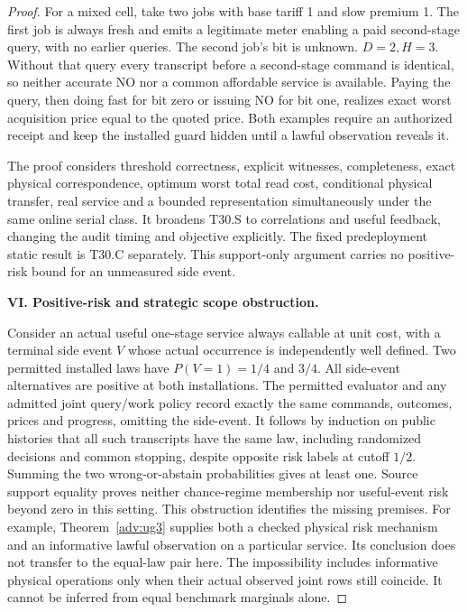 \begin{proof}
For a mixed cell, take two jobs with base tariff 1 and slow premium 1. The first job is always fresh and emits a legitimate meter enabling a paid second-stage query, with no earlier queries. The second job's bit is unknown. \(D=2,H=3\). Without that query every transcript before a second-stage command is identical, so neither accurate NO nor a common affordable service is available. Paying the query, then doing fast for bit zero or issuing NO for bit one, realizes exact worst acquisition price equal to the quoted price. Both examples require an authorized receipt and keep the installed guard hidden until a lawful observation reveals it.

The proof considers threshold correctness, explicit witnesses, completeness, exact physical correspondence, optimum worst total read cost, conditional physical transfer, real service and a bounded representation simultaneously under the same online serial class. It broadens T30.S to correlations and useful feedback, changing the audit timing and objective explicitly. The fixed predeployment static result is T30.C separately. This support-only argument carries no positive-risk bound for an unmeasured side event.

\textbf{VI. Positive-risk and strategic scope obstruction.}

Consider an actual useful one-stage service always callable at unit cost, with a terminal side event \(V\) whose actual occurrence is independently well defined. Two permitted installed laws have \(P(V=1)=1/4\) and \(3/4\). All side-event alternatives are positive at both installations. The permitted evaluator and any admitted joint query/work policy record exactly the same commands, outcomes, prices and progress, omitting the side-event. It follows by induction on public histories that all such transcripts have the same law, including randomized decisions and common stopping, despite opposite risk labels at cutoff \(1/2\). Summing the two wrong-or-abstain probabilities gives at least one. Source support equality proves neither chance-regime membership nor useful-event risk beyond zero in this setting. This obstruction identifies the missing premises. For example, Theorem~\ref{adv:ug3} supplies both a checked physical risk mechanism and an informative lawful observation on a particular service. Its conclusion does not transfer to the equal-law pair here. The impossibility includes informative physical operations only when their actual observed joint rows still coincide. It cannot be inferred from equal benchmark marginals alone.

\end{proof}
